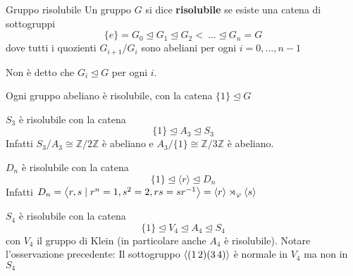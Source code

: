 \begin{definition}{Gruppo risolubile}
    Un gruppo \(G\) si dice \textbf{risolubile} se esiste una catena di
    sottogruppi 
    \[
      \{e\}  = G_{0} \trianglelefteq G_{1} \trianglelefteq G_{2} <~\dots
      \trianglelefteq G_{n} = G
    \]
    dove tutti i quozienti \(G_{i+1} / G_{i} \) sono abeliani per ogni \( i = 0,
    \dots, n-1\) 
\end{definition}
\begin{remark}
    Non è detto che \(G_{i} \trianglelefteq G\) per ogni \(i\).  
\end{remark}
\begin{example}
    Ogni gruppo abeliano è risolubile, con la catena \(\{1\} \trianglelefteq G\) 
\end{example}
\begin{example}[\(S_3\) ]
    \(S_{3}\) è risolubile con la catena
    \[
        \{1\} \trianglelefteq A_{3} \trianglelefteq S_{3} 
    \]
    Infatti \(S_{3} / A_{3} \cong \mathbb{Z} / 2\mathbb{Z}\) è abeliano e
    \(A_{3} / \{1\} \cong \mathbb{Z} / 3\mathbb{Z}\) è abeliano.
\end{example}
\begin{example}
    \(D_{n}\) è risolubile con la catena
    \[
        \{1\}  \trianglelefteq \langle r \rangle \trianglelefteq D_{n}
    \]
    Infatti \(D_{n} = {\left\langle r, s \mid r^{n} = 1, s ^2 = 2, rs = sr^{-1} \right\rangle} =
    {\left\langle r\right\rangle} \rtimes_\varphi {\left\langle s\right\rangle}  \)
\end{example}
\begin{example}
    \(S_{4}\) è risolubile con la catena
    \[
        \{1\} \trianglelefteq V_4 \trianglelefteq A_{4} \trianglelefteq S_{4}
    \]
    con \(V_{4}\) il gruppo di Klein (in particolare anche \(A_{4}\) è
    risolubile). Notare l'osservazione precedente: Il sottogruppo
    \({\left\langle{(1\,2)}{(3\,4)}\right\rangle} \) è normale in \(V_{4}\) ma non in \(S_{4}\) 
\end{example}

